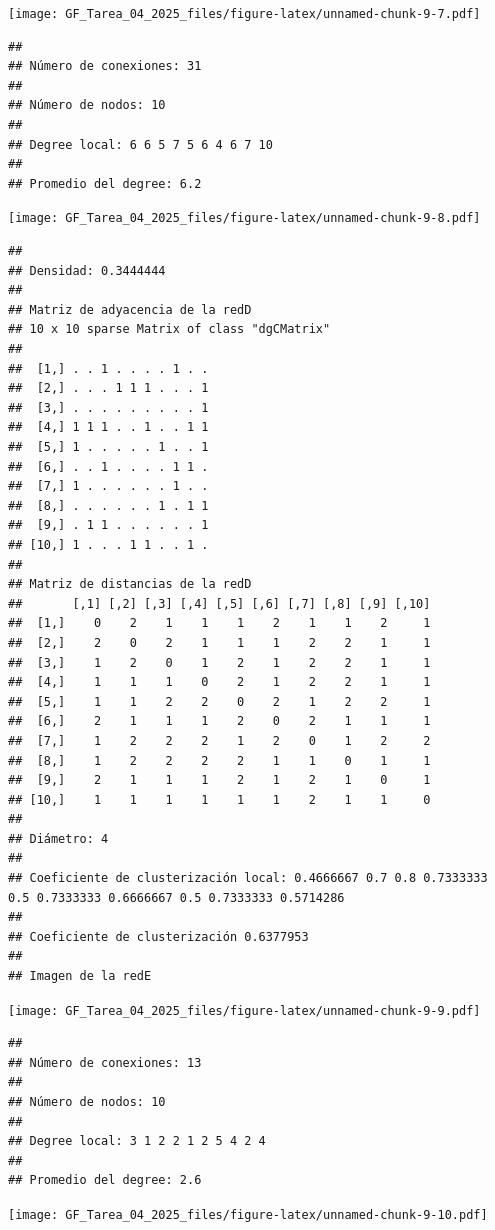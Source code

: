 \documentclass[
]{article}
\begin{document}
\texttt{[image: GF\_Tarea\_04\_2025\_files/figure-latex/unnamed-chunk-9-7.pdf]}

\begin{verbatim}
## 
## Número de conexiones: 31 
## 
## Número de nodos: 10 
## 
## Degree local: 6 6 5 7 5 6 4 6 7 10 
## 
## Promedio del degree: 6.2
\end{verbatim}

\texttt{[image: GF\_Tarea\_04\_2025\_files/figure-latex/unnamed-chunk-9-8.pdf]}

\begin{verbatim}
## 
## Densidad: 0.3444444 
## 
## Matriz de adyacencia de la redD 
## 10 x 10 sparse Matrix of class "dgCMatrix"
##                          
##  [1,] . . 1 . . . . 1 . .
##  [2,] . . . 1 1 1 . . . 1
##  [3,] . . . . . . . . . 1
##  [4,] 1 1 1 . . 1 . . 1 1
##  [5,] 1 . . . . . 1 . . 1
##  [6,] . . 1 . . . . 1 1 .
##  [7,] 1 . . . . . . 1 . .
##  [8,] . . . . . . 1 . 1 1
##  [9,] . 1 1 . . . . . . 1
## [10,] 1 . . . 1 1 . . 1 .
## 
## Matriz de distancias de la redD 
##       [,1] [,2] [,3] [,4] [,5] [,6] [,7] [,8] [,9] [,10]
##  [1,]    0    2    1    1    1    2    1    1    2     1
##  [2,]    2    0    2    1    1    1    2    2    1     1
##  [3,]    1    2    0    1    2    1    2    2    1     1
##  [4,]    1    1    1    0    2    1    2    2    1     1
##  [5,]    1    1    2    2    0    2    1    2    2     1
##  [6,]    2    1    1    1    2    0    2    1    1     1
##  [7,]    1    2    2    2    1    2    0    1    2     2
##  [8,]    1    2    2    2    2    1    1    0    1     1
##  [9,]    2    1    1    1    2    1    2    1    0     1
## [10,]    1    1    1    1    1    1    2    1    1     0
## 
## Diámetro: 4 
## 
## Coeficiente de clusterización local: 0.4666667 0.7 0.8 0.7333333 0.5 0.7333333 0.6666667 0.5 0.7333333 0.5714286 
## 
## Coeficiente de clusterización 0.6377953 
## 
## Imagen de la redE
\end{verbatim}

\texttt{[image: GF\_Tarea\_04\_2025\_files/figure-latex/unnamed-chunk-9-9.pdf]}

\begin{verbatim}
## 
## Número de conexiones: 13 
## 
## Número de nodos: 10 
## 
## Degree local: 3 1 2 2 1 2 5 4 2 4 
## 
## Promedio del degree: 2.6
\end{verbatim}

\texttt{[image: GF\_Tarea\_04\_2025\_files/figure-latex/unnamed-chunk-9-10.pdf]}
\end{document}
